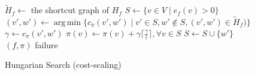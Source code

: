 \documentclass[11pt]{article}
\def\eps{\varepsilon}
\DeclareMathOperator*{\argmin}{arg\,min}
\theoremstyle{plain}
\numberwithin{figure}{section}
\begin{document}
\begin{figure*}
\centering
\begin{minipage}{.8\linewidth}
\begin{algorithm}[H]
\caption{Hungarian Search (cost-scaling)}
\begin{algorithmic}[1]
	\State $\tilde{H}_f \gets$ the shortcut graph of $H_f$
	\State $S \gets \{v \in V \mid e_f(v) > 0\}$
	\Repeat
		\State $(v', w') \gets \argmin\{c_\pi(v', w') \mid v' \in S, w' \not\in S, (v', w') \in \tilde{H}_f)\}$
			\label{line:hs_relaxation}
		\State $\gamma \gets c_\pi(v', w')$
			\State $\pi(v) \gets \pi(v) + \gamma\lceil\frac{\gamma}{\eps}\rceil, \forall v \in S$
		\EndIf
		\State $S \gets S \cup \{w'\}$
		\Statex %
		 
			\State\Return $(f, \pi)$
		\EndIf
	\State\Return failure
\EndFunction
\end{algorithmic}
\end{algorithm}
\end{minipage}
\end{figure*}
\end{document}
